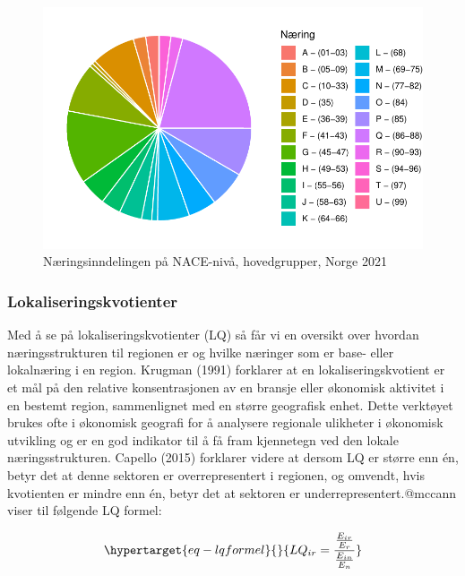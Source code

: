 \documentclass[
]{article}
\begin{document}
\begin{figure}[H]

{\centering \includegraphics{Masteroppgave_files/figure-pdf/fig-kake-norge-1.pdf}

}

\caption{\label{fig-kake-norge}Næringsinndelingen på NACE-nivå,
hovedgrupper, Norge 2021}

\end{figure}

\hypertarget{lokaliseringskvotienter}{%
\subsubsection{Lokaliseringskvotienter}\label{lokaliseringskvotienter}}

Med å se på lokaliseringskvotienter (LQ) så får vi en oversikt over
hvordan næringsstrukturen til regionen er og hvilke næringer som er
base- eller lokalnæring i en region. Krugman (1991) forklarer at en
lokaliseringskvotient er et mål på den relative konsentrasjonen av en
bransje eller økonomisk aktivitet i en bestemt region, sammenlignet med
en større geografisk enhet. Dette verktøyet brukes ofte i økonomisk
geografi for å analysere regionale ulikheter i økonomisk utvikling og er
en god indikator til å få fram kjennetegn ved den lokale
næringsstrukturen. Capello (2015) forklarer videre at dersom LQ er
større enn én, betyr det at denne sektoren er overrepresentert i
regionen, og omvendt, hvis kvotienten er mindre enn én, betyr det at
sektoren er underrepresentert.@mccann viser til følgende LQ formel:

\begin{equation}\protect\hypertarget{eq-lqformel}{}{
LQ_{ir} = \frac{\frac{E_{ir}}{E_r}}{\frac{E_{in}}{E_n}}
}\label{eq-lqformel}\end{equation}
\end{document}
